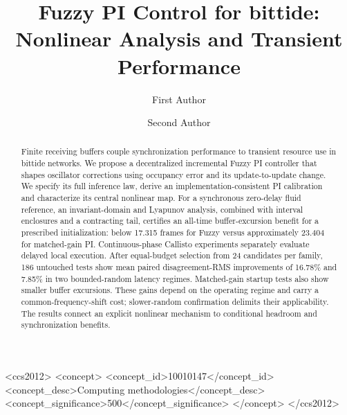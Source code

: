 \documentclass[sigconf]{acmart}
\begin{document}
\title[Fuzzy PI Control for bittide]{Fuzzy PI Control for bittide: Nonlinear Analysis and Transient Performance}

\author{First Author}

\author{Second Author}

\renewcommand{\shortauthors}{First Author and Second Author}

\begin{abstract}
Finite receiving buffers couple synchronization performance to transient
resource use in bittide networks. We propose a decentralized incremental
Fuzzy PI controller that shapes oscillator corrections using occupancy
error and its update-to-update change. We specify its full inference law,
derive an implementation-consistent PI calibration and characterize its
central nonlinear map. For a synchronous zero-delay fluid reference,
an invariant-domain and Lyapunov analysis, combined with interval
enclosures and a contracting tail, certifies an all-time buffer-excursion
benefit for a prescribed initialization: below 17.315 frames for Fuzzy
versus approximately 23.404 for matched-gain PI. Continuous-phase Callisto
experiments separately evaluate delayed local execution. After equal-budget
selection from 24 candidates per family, 186 untouched tests show
mean paired disagreement-RMS improvements of 16.78\% and 7.85\% in two
bounded-random latency regimes. Matched-gain startup tests also show
smaller buffer excursions. These gains depend on the operating regime
and carry a common-frequency-shift cost; slower-random confirmation
delimits their applicability. The results connect an explicit nonlinear
mechanism to conditional headroom and synchronization benefits.
\end{abstract}


\begin{CCSXML}
<ccs2012>
 <concept>
  <concept_id>10010147</concept_id>
  <concept_desc>Computing methodologies</concept_desc>
  <concept_significance>500</concept_significance>
 </concept>
</ccs2012>
\end{CCSXML}
\end{document}
